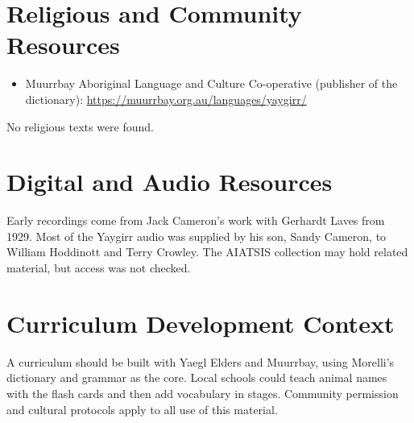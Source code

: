 \documentclass[12pt]{article}
\begin{document}
\section{Religious and Community Resources}
\begin{itemize}
\item Muurrbay Aboriginal Language and Culture Co-operative (publisher of the dictionary): \url{https://muurrbay.org.au/languages/yaygirr/}
\end{itemize}
No religious texts were found.

\section{Digital and Audio Resources}
Early recordings come from Jack Cameron's work with Gerhardt Laves from 1929. Most of the Yaygirr audio was supplied by his son, Sandy Cameron, to William Hoddinott and Terry Crowley. The AIATSIS collection may hold related material, but access was not checked.

\section{Curriculum Development Context}
A curriculum should be built with Yaegl Elders and Muurrbay, using Morelli's dictionary and grammar as the core. Local schools could teach animal names with the flash cards and then add vocabulary in stages. Community permission and cultural protocols apply to all use of this material.
\end{document}
